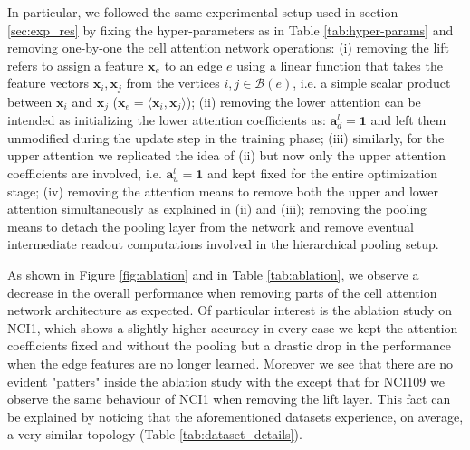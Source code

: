 \documentclass{article}
\begin{document}
In particular, we followed the same experimental setup used in section \ref{sec:exp_res} by fixing the hyper-parameters as in Table \ref{tab:hyper-params} and removing one-by-one the cell attention network operations: (i) removing the lift refers to assign a feature $\mathbf{x}_e$ to an edge $e$ using a linear function that takes the feature vectors $\mathbf{x}_i, \mathbf{x}_j$  from the vertices $i,j \in \mathcal{B}(e)$, i.e. a simple scalar product between $\mathbf{x}_i$ and $\mathbf{x}_j$ ($\mathbf{x}_e = \langle \mathbf{x}_i, \mathbf{x}_j \rangle$); (ii) removing the lower attention can be intended as initializing the lower attention coefficients as: $\mathbf{a}_{d}^l = \boldsymbol{1}$ and left them unmodified during the update step in the training phase; (iii) similarly, for the upper attention we replicated the idea of (ii) but now only the upper attention coefficients are involved, i.e.  $\mathbf{a}_{u}^l = \boldsymbol{1}$ and kept fixed for the entire optimization stage; (iv) removing the attention means to remove both the upper and lower attention simultaneously as explained in (ii) and (iii); removing the pooling means to detach the pooling layer from the network and remove eventual intermediate readout computations involved in the hierarchical pooling setup.

As shown in Figure \ref{fig:ablation} and in Table \ref{tab:ablation}, we observe a decrease in the overall performance when removing parts of the cell attention network architecture as expected. Of particular interest is the ablation study on NCI1, which shows a slightly higher accuracy in every case we kept the attention coefficients fixed and without the pooling but a drastic drop in the performance when the edge features are no longer learned. Moreover we see that there are no evident "patters" inside the ablation study with the except that for NCI109 we observe the same behaviour of NCI1 when removing the lift layer. This fact can be explained by noticing that the aforementioned datasets experience, on average, a very similar topology (Table \ref{tab:dataset_details}).
\end{document}
